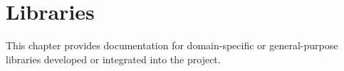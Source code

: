 \chapter{Libraries}
\label{chap:libraries}

This chapter provides documentation for domain-specific or general-purpose libraries developed or integrated into the project.

